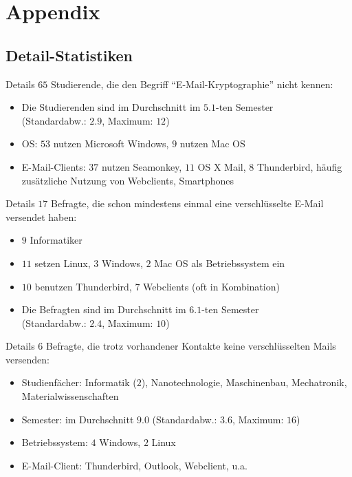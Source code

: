 \documentclass[]{beamer}
\begin{document}
\appendix
\section{Appendix}
\subsection*{Detail-Statistiken}
\begin{frame}{Details}
	$65$ Studierende, die den Begriff ``E-Mail-Kryptographie'' nicht kennen:
	\begin{itemize}
		\item Die Studierenden sind im Durchschnitt im $5.1$-ten Semester\\ (Standardabw.: $2.9$, Maximum: $12$)
		\item OS: $53$ nutzen Microsoft Windows, $9$ nutzen Mac OS
		\item E-Mail-Clients: $37$ nutzen Seamonkey, $11$ OS X Mail, $8$ Thunderbird, häufig zusätzliche Nutzung von Webclients, Smartphones
	\end{itemize}
\end{frame}

\begin{frame}{Details}
	$17$ Befragte, die schon mindestens einmal eine verschlüsselte E-Mail versendet haben:
	\begin{itemize}
		\item $9$ Informatiker
		\item $11$ setzen Linux, $3$ Windows, $2$ Mac OS als Betriebssystem ein
		\item $10$ benutzen Thunderbird, $7$ Webclients (oft in Kombination)
		\item Die Befragten sind im Durchschnitt im $6.1$-ten Semester\\(Standardabw.: $2.4$, Maximum: $10$)
	\end{itemize}
\end{frame}


\begin{frame}{Details}
	$6$ Befragte, die trotz vorhandener Kontakte keine verschlüsselten Mails versenden:
	\begin{itemize}
		\item Studienfächer: Informatik ($2$), Nanotechnologie, Maschinenbau, Mechatronik, Materialwissenschaften
		\item Semester: im Durchschnitt $9.0$ (Standardabw.: $3.6$, Maximum: $16$)
		\item Betriebssystem: $4$ Windows, $2$ Linux
		\item E-Mail-Client: Thunderbird, Outlook, Webclient, u.a.
	\end{itemize}
\end{frame}
\end{document}

